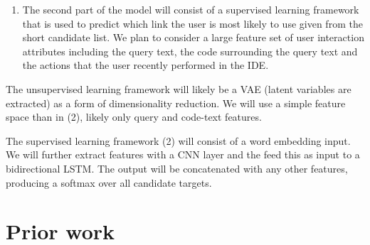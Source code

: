 \documentclass{article}
\begin{document}
\begin{multicols}{2}
\begin{enumerate}
\item The second part of the model will consist of a supervised learning framework that is used to predict which link the user is most likely to use given from the short candidate list. We plan to consider a large feature set of user interaction attributes including the query text, the code surrounding the query text and the actions that the user recently performed in the IDE.  

\end{enumerate}

The unsupervised learning framework will likely be a VAE (latent variables are extracted) as a form of dimensionality reduction.  We will use a simple feature space than in (2), likely only query and code-text features. %

The supervised learning framework (2) will consist of a word embedding input.  We will further extract features with a CNN layer and the feed this as input to a bidirectional LSTM. The output will be concatenated with any other features, producing a softmax over all candidate targets.

\section{Prior work}


\end{multicols}
\end{document}
